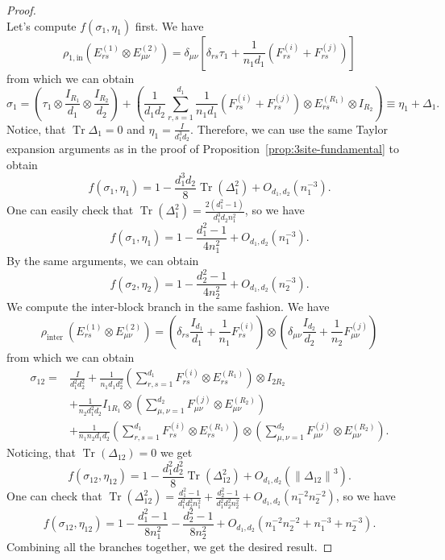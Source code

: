 \documentclass[10pt,twocolumn,superscriptaddress,aps,amsmath,amssymb,citeautoscript,floatfix,prx]{revtex4-2}
\theoremstyle{plain}
\theoremstyle{plain}
\theoremstyle{plain}
\theoremstyle{plain}
\theoremstyle{plain}
\theoremstyle{plain}
\theoremstyle{plain}
\theoremstyle{definition}
\theoremstyle{plain}
\begin{document}
\begin{appendix}
\begin{proof}
$$$$
Let's compute $f\left(\sigma_1, \eta_1\right)$ first. We have
$$
\rho_{1, \mathrm{in}}\left(E_{r s}^{(1)} \otimes E_{\mu \nu}^{(2)}\right)=\delta_{\mu \nu}\left[\delta_{r s} \tau_1+\frac{1}{n_1 d_1}\left(F_{r s}^{(i)}+F_{r s}^{(j)}\right)\right]
$$
from which we can obtain
$$
\sigma_1=\left(\tau_1 \otimes \frac{I_{R_1}}{d_1} \otimes \frac{I_{R_2}}{d_2}\right)+\left(\frac{1}{d_1 d_2} \sum_{r, s=1}^{d_1} \frac{1}{n_1 d_1}\left(F_{r s}^{(i)}+F_{r s}^{(j)}\right) \otimes E_{r s}^{\left(R_1\right)} \otimes I_{R_2}\right)\equiv \eta_1+\Delta_1.
$$
Notice, that $\operatorname{Tr} \Delta_1=0$ and $\eta_1=\frac{I}{d_1^3d_2}$. Therefore, we can use the same Taylor expansion arguments as in the proof of Proposition~\ref{prop:3site-fundamental} to obtain
$$
f\left(\sigma_1, \eta_1\right)=1-\frac{d_1^3 d_2}{8} \operatorname{Tr}\left(\Delta_1^2\right)+O_{d_1,d_2}\left(n_1^{-3}\right).
$$
One can easily check that $\operatorname{Tr}\left(\Delta_1^2\right)=\frac{2\left(d_1^2-1\right)}{d_1^3 d_2 n_1^2}$, so we have
$$
f\left(\sigma_1, \eta_1\right)=1-\frac{d_1^2-1}{4 n_1^2}+O_{d_1,d_2}\left(n_1^{-3}\right).
$$
By the same arguments, we can obtain
$$
f\left(\sigma_2, \eta_2\right)=1-\frac{d_2^2-1}{4 n_2^2}+O_{d_1,d_2}\left(n_2^{-3}\right).
$$
We compute the inter-block branch in the same fashion. We have
$$
\rho_{\text {inter }}\left(E_{r s}^{(1)} \otimes E_{\mu \nu}^{(2)}\right)=\left(\delta_{r s} \frac{I_{d_1}}{d_1}+\frac{1}{n_1} F_{r s}^{(i)}\right) \otimes\left(\delta_{\mu \nu} \frac{I_{d_2}}{d_2}+\frac{1}{n_2} F_{\mu \nu}^{(j)}\right)
$$
from which we can obtain
\[
\begin{aligned}
\sigma_{12}
=&
\frac{I}{d_1^2 d_2^2}
+
\frac{1}{n_1 d_1 d_2^2}
\left(
\sum_{r,s=1}^{d_1}
F_{rs}^{(i)}\otimes E_{rs}^{(R_1)}
\right)
\otimes I_{2R_2}
\\
&+
\frac{1}{n_2 d_1^2 d_2}
I_{1R_1}\otimes
\left(
\sum_{\mu,\nu=1}^{d_2}
F_{\mu\nu}^{(j)}\otimes E_{\mu\nu}^{(R_2)}
\right)
\\
&+
\frac{1}{n_1n_2d_1d_2}
\left(
\sum_{r,s=1}^{d_1}
F_{rs}^{(i)}\otimes E_{rs}^{(R_1)}
\right)
\otimes
\left(
\sum_{\mu,\nu=1}^{d_2}
F_{\mu\nu}^{(j)}\otimes E_{\mu\nu}^{(R_2)}
\right).
\end{aligned}
\]
Noticing, that $\operatorname{Tr}\left(\Delta_{12}\right)=0$ we get
\[
    f\left(\sigma_{12}, \eta_{12}\right)=1-\frac{d_1^2 d_2^2}{8} \operatorname{Tr}\left(\Delta_{12}^2\right)+O_{d_1,d_2}\left(\left\|\Delta_{12}\right\|^3\right).
\]
One can check that $\operatorname{Tr}\left(\Delta_{12}^2\right)=\frac{d_1^2-1}{d_1^2 d_2^2 n_1^2}+\frac{d_2^2-1}{d_1^2 d_2^2 n_2^2}+O_{d_1,d_2}\left(n_1^{-2} n_2^{-2}\right)$, so we have
\[
    f\left(\sigma_{12}, \eta_{12}\right)=1-\frac{d_1^2-1}{8 n_1^2}-\frac{d_2^2-1}{8 n_2^2}+O_{d_1,d_2}\left(n_1^{-2} n_2^{-2}+n_1^{-3}+n_2^{-3}\right).
\]
Combining all the branches together, we get the desired result.
\end{proof}


\end{appendix}
\end{document}
